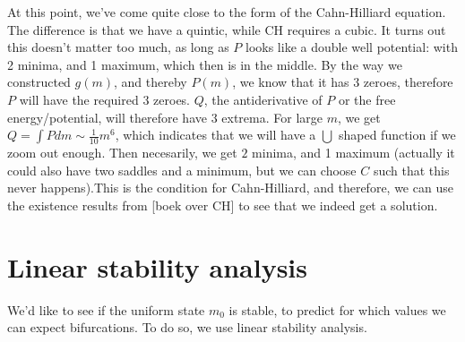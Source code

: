 \documentclass[a4paper]{jpconf}
\begin{document}
At this point, we've come quite close to the form of the Cahn-Hilliard equation. The difference is that we have a quintic, while CH requires a cubic. It turns out this doesn't matter too much, as long as $P$ looks like a double well potential: with 2 minima, and 1 maximum, which then is in the middle. By the way we constructed $g(m)$, and thereby $P(m)$, we know that it has $3$ zeroes, therefore $P$ will have the required 3 zeroes.
$Q$, the antiderivative of $P$ or the free energy/potential, will therefore have $3$ extrema. For large $m$, we get $Q=\int Pdm\sim \frac1{10}m^6$, which indicates that we will have a $\bigcup$ shaped function if we zoom out enough. Then necesarily, we get $2$ minima, and 1 maximum (actually it could also have two saddles and a minimum, but we can choose $C$ such that this never happens).This is the condition for Cahn-Hilliard, and therefore, we can use the existence results from [boek over CH] to see that we indeed get a solution. 


\section{Linear stability analysis}
We'd like to see if the uniform state $m_0$ is stable, to predict for which values we can expect bifurcations. To do so, we use linear stability analysis. 
\end{document}

